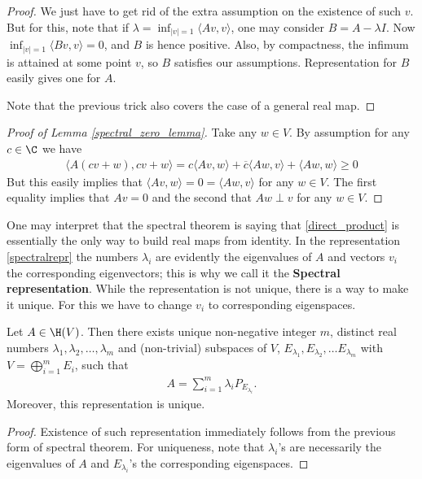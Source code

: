 \begin{proof}
	We just have to get rid of the extra assumption on the existence of such $v$. But for this, note that if $\lambda = \inf_{|v| = 1} \langle A v, v \rangle$, one may consider $B = A - \lambda I$. Now $\inf_{|v| = 1} \langle B v, v \rangle = 0$, and $B$ is hence positive. Also, by compactness, the infimum is attained at some point $v$, so $B$ satisfies our assumptions. Representation for $B$ easily gives one for $A$.

	Note that the previous trick also covers the case of a general real map.
\end{proof}

\begin{proof}[Proof of Lemma \ref{spectral_zero_lemma}]
	Take any $w \in V$. By assumption for any $c \in \C$ we have
	\begin{align*}
		\langle A (c v + w), c v + w \rangle = c \langle A v, w \rangle + \overline{c} \langle A w, v \rangle + \langle A w, w \rangle \geq 0
	\end{align*}
	But this easily implies that $\langle A v, w \rangle = 0 = \langle A w, v \rangle$ for any $w \in V$. The first equality implies that $A v = 0$ and the second that $A w \perp v$ for any $w \in V$.
\end{proof}

One may interpret that the spectral theorem is saying that \ref{direct_product} is essentially the only way to build real maps from identity. In the representation \ref{spectralrepr} the numbers $\lambda_{i}$ are evidently the eigenvalues of $A$ and vectors $v_{i}$ the corresponding eigenvectors; this is why we call it the \textbf{Spectral representation}. While the representation is not unique, there is a way to make it unique. For this we have to change $v_{i}$ to corresponding eigenspaces.

\begin{lause}
	Let $A \in \H(V)$. Then there exists unique non-negative integer $m$, distinct real numbers $\lambda_{1}, \lambda_{2}, \ldots, \lambda_{m}$ and (non-trivial) subspaces of $V$, $E_{\lambda_{1}}, E_{\lambda_{2}}, \ldots E_{\lambda_{m}}$ with $V = \bigoplus_{i = 1}^{m} E_{i}$, such that
	\begin{align}\label{spectralrepr2}
		A = \sum_{i = 1}^{m} \lambda_{i} P_{E_{\lambda_{i}}}.
	\end{align}
	Moreover, this representation is unique.
\end{lause}
\begin{proof}
	Existence of such representation immediately follows from the previous form of spectral theorem. For uniqueness, note that $\lambda_{i}$'s are necessarily the eigenvalues of $A$ and $E_{\lambda_{i}}$'s the corresponding eigenspaces.
\end{proof}

